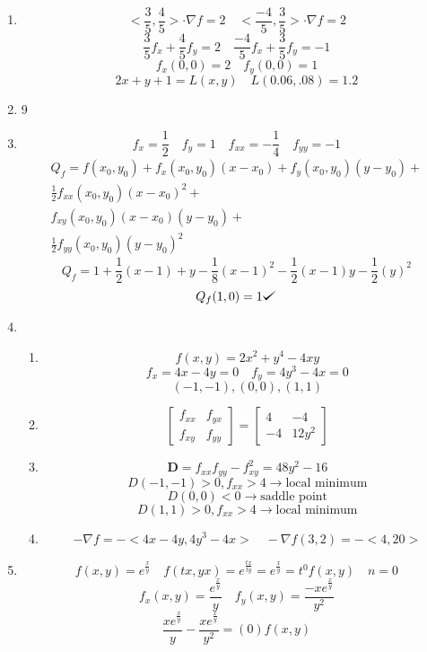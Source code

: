\documentclass[12pt]{article}
\def\checkmark{\tikz\fill[scale=0.4](0,.35) -- (.25,0) -- (1,.7) -- (.25,.15) -- cycle;}
\begin{document}
\begin{enumerate}
\item $$<\frac{3}{5}, \frac{4}{5}> \cdot \nabla f = 2 \quad <\frac{-4}{5}, \frac{3}{5}> \cdot \nabla f = 2$$
$$\frac{3}{5}f_x+\frac{4}{5}f_y=2 \quad \frac{-4}{5}f_x+\frac{3}{5}f_y=-1$$
$$f_x (0,0) = 2 \quad f_y(0,0)=1$$
$$2x+y+1=L(x,y) \quad L(0.06, .08) = 1.2$$
\item 9
\item 
$$f_x = \frac{1}{2} \quad f_y = 1 \quad f_{xx} = -\frac{1}{4} \quad f_{yy}=-1$$
\begin{align*}
Q_f=f(x_0,y_0)+f_x(x_0,y_0)(x-x_0)+f_y(x_0,y_0)(y-y_0)+ \\
\frac{1}{2}f_{xx}(x_0,y_0)(x-x_0)^2+ \\
f_{xy}(x_0,y_0)(x-x_0)(y-y_0)+ \\
\frac{1}{2}f_{yy}(x_0,y_0)(y-y_0)^2
\end{align*}
$$Q_f = 1+\frac{1}{2}(x-1)+y-\frac{1}{8}(x-1)^2-\frac{1}{2}(x-1)y-\frac{1}{2}(y)^2$$
$$Q_f(1,0) = 1 \checkmark$$
\item \begin{enumerate}
\item $$f(x,y) = 2x^2+y^4-4xy$$
$$f_x = 4x-4y = 0 \quad f_y = 4y^3-4x=0$$
$$(-1,-1), (0,0), (1,1)$$
\item 
$$
\begin{bmatrix}
   f_{xx} & f_{yx} \\
   f_{xy} & f_{yy}
\end{bmatrix}
=
\begin{bmatrix}
   4 & -4 \\
   -4 & 12y^2
\end{bmatrix}$$
\item $$\textbf{D} = f_{xx}f_{yy} - f_{xy}^2 = 48y^2-16$$
$$D(-1,-1) > 0, f_{xx} > 4 \rightarrow \textrm{local minimum}$$
$$D(0,0) < 0 \rightarrow \textrm{saddle point}$$
$$D(1,1) > 0, f_{xx} > 4 \rightarrow \textrm{local minimum}$$
\item $$-\nabla f = -<4x-4y, 4y^3-4x> \quad -\nabla f(3,2) = -<4, 20>$$
\end{enumerate}
\item $$f(x,y)=e^{\frac{x}{y}} \quad f(tx,yx) = e^{\frac{tx}{ty}} = e^{\frac{x}{y}} = t^0f(x,y) \quad n = 0$$
$$f_x(x,y) = \frac{e^{\frac{x}{y}}}{y} \quad f_y(x,y)=\frac{-xe^{\frac{x}{y}}}{y^2}$$
$$\frac{xe^{\frac{x}{y}}}{y} - \frac{xe^{\frac{x}{y}}}{y^2} = (0)f(x,y)$$
\end{enumerate} 
\end{document}
